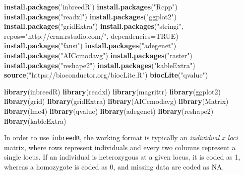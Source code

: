 \documentclass[]{article}
\newenvironment{Shaded}{\begin{snugshade}}{\end{snugshade}}
\newcommand{\KeywordTok}[1]{\textcolor[rgb]{0.13,0.29,0.53}{\textbf{#1}}}
\newcommand{\DataTypeTok}[1]{\textcolor[rgb]{0.13,0.29,0.53}{#1}}
\newcommand{\StringTok}[1]{\textcolor[rgb]{0.31,0.60,0.02}{#1}}
\newcommand{\OtherTok}[1]{\textcolor[rgb]{0.56,0.35,0.01}{#1}}
\newcommand{\NormalTok}[1]{#1}
\begin{document}
\begin{Shaded}
\begin{Highlighting}[]
\KeywordTok{install.packages}\NormalTok{(}\StringTok{'inbreedR'}\NormalTok{)}
\KeywordTok{install.packages}\NormalTok{(}\StringTok{"Rcpp"}\NormalTok{)}
\KeywordTok{install.packages}\NormalTok{(}\StringTok{"readxl"}\NormalTok{)}
\KeywordTok{install.packages}\NormalTok{(}\StringTok{"ggplot2"}\NormalTok{)}
\KeywordTok{install.packages}\NormalTok{(}\StringTok{"gridExtra"}\NormalTok{)}
\KeywordTok{install.packages}\NormalTok{(}\StringTok{"stringi"}\NormalTok{, }\DataTypeTok{repos=}\StringTok{"http://cran.rstudio.com/"}\NormalTok{, }\DataTypeTok{dependencies=}\OtherTok{TRUE}\NormalTok{)}
\KeywordTok{install.packages}\NormalTok{(}\StringTok{"fansi"}\NormalTok{)}
\KeywordTok{install.packages}\NormalTok{(}\StringTok{"adegenet"}\NormalTok{)}
\KeywordTok{install.packages}\NormalTok{(}\StringTok{"AICcmodavg"}\NormalTok{)}
\KeywordTok{install.packages}\NormalTok{(}\StringTok{"raster"}\NormalTok{)}
\KeywordTok{install.packages}\NormalTok{(}\StringTok{"reshape2"}\NormalTok{)}
\KeywordTok{install.packages}\NormalTok{(}\StringTok{"kableExtra"}\NormalTok{)}
\KeywordTok{source}\NormalTok{(}\StringTok{"https://bioconductor.org/biocLite.R"}\NormalTok{)}
\KeywordTok{biocLite}\NormalTok{(}\StringTok{"qvalue"}\NormalTok{)}
\end{Highlighting}
\end{Shaded}

\begin{Shaded}
\begin{Highlighting}[]
\KeywordTok{library}\NormalTok{(inbreedR)}
\KeywordTok{library}\NormalTok{(readxl)}
\KeywordTok{library}\NormalTok{(magrittr)}
\KeywordTok{library}\NormalTok{(ggplot2)}
\KeywordTok{library}\NormalTok{(grid)}
\KeywordTok{library}\NormalTok{(gridExtra)}
\KeywordTok{library}\NormalTok{(AICcmodavg)}
\KeywordTok{library}\NormalTok{(Matrix)}
\KeywordTok{library}\NormalTok{(lme4)}
\KeywordTok{library}\NormalTok{(qvalue)}
\KeywordTok{library}\NormalTok{(adegenet)}
\KeywordTok{library}\NormalTok{(reshape2)}
\KeywordTok{library}\NormalTok{(kableExtra)}
\end{Highlighting}
\end{Shaded}

In order to use \texttt{inbreedR}, the working format is typically an
\emph{individual x loci} matrix, where rows represent individuals and
every two columns represent a single locus. If an individual is
heterozygous at a given locus, it is coded as 1, whereas a homozygote is
coded as 0, and missing data are coded as NA.
\end{document}
